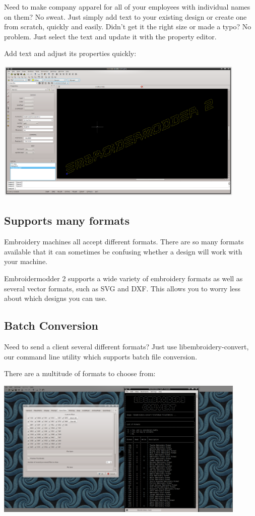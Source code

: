\documentclass[a4paper, 11pt]{report}
\begin{document}
Need to make company apparel for all of your employees with individual names on them? No sweat. Just simply add text to your existing design or create one from scratch, quickly and easily.
Didn't get it the right size or made a typo? No problem. Just select the text and update it with the property editor.

Add text and adjust its properties quickly:

\includegraphics[width=0.9\textwidth]{images/features-text-1.png}

\subsection{Supports many formats}

Embroidery machines all accept different formats. There are so many formats available that it can sometimes be confusing whether a design will work with your machine.

Embroidermodder 2 supports a wide variety of embroidery formats as well as several vector formats, such as SVG and DXF. This allows you to worry less about which designs you can use.

\subsection{Batch Conversion}

Need to send a client several different formats? Just use libembroidery-convert, our command line utility which supports batch file conversion.

There are a multitude of formats to choose from:

\includegraphics[width=0.9\textwidth]{images/features-formats-1.png}
\end{document}
